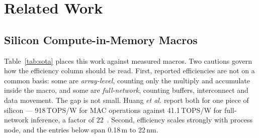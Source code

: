 \documentclass[conference]{IEEEtran}
\begin{document}
\section{Related Work}
\subsection{Silicon Compute-in-Memory Macros}
Table~\ref{tab:sota} places this work against measured macros. Two cautions govern how the efficiency column should be read. First, reported efficiencies are not on a common basis: some are \emph{array-level}, counting only the multiply and accumulate inside the macro, and some are \emph{full-network}, counting buffers, interconnect and data movement. The gap is not small. Huang \emph{et al.} report both for one piece of silicon --- 918\,TOPS/W for MAC operations against 41.1\,TOPS/W for full-network inference, a factor of $22$~\cite{facim}. Second, efficiency scales strongly with process node, and the entries below span 0.18\,\textmu m to 22\,nm.
\end{document}
